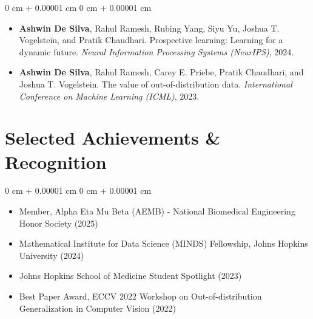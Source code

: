 \documentclass[10pt, letterpaper]{article}
\newenvironment{highlights}{
    \begin{itemize}[
        topsep=0.10 cm,
        parsep=0.10 cm,
        partopsep=0pt,
        itemsep=0pt,
        leftmargin=0 cm + 10pt
    ]
}{
    \end{itemize}
} %
\newenvironment{onecolentry}{
    \begin{adjustwidth}{
        0 cm + 0.00001 cm
    }{
        0 cm + 0.00001 cm
    }
}{
    \end{adjustwidth}
} %
\newenvironment{twocolentry}[2][]{
    \onecolentry
    \def\secondColumn{#2}
    \setcolumnwidth{\fill, 4.5 cm}
    \begin{paracol}{2}
}{
    \switchcolumn \raggedleft \secondColumn
    \end{paracol}
    \endonecolentry
} %
\begin{document}
        \begin{onecolentry}
            \begin{highlights}
                 \item \textbf{Ashwin De Silva}, Rahul Ramesh, Rubing Yang, Siyu Yu, Joshua T. Vogelstein, and Pratik Chaudhari. Prospective learning: Learning for a dynamic future. \textit{Neural Information Processing Systems (NeurIPS)}, 2024.
                 \item \textbf{Ashwin De Silva}, Rahul Ramesh, Carey E. Priebe, Pratik Chaudhari, and Joshua T. Vogelstein. The value of out-of-distribution data. \textit{International Conference on Machine Learning (ICML)}, 2023.
            \end{highlights}
        \end{onecolentry}


    \section{Selected Achievements \& Recognition}

    \begin{onecolentry}
        \begin{highlights}
            \item Member, Alpha Eta Mu Beta (AEMB) - National Biomedical Engineering Honor Society (2025)
            \item Mathematical Institute for Data Science (MINDS) Fellowship, Johns Hopkins University (2024)
            \item Johns Hopkins School of Medicine Student Spotlight (2023)
            \item Best Paper Award, ECCV 2022 Workshop on Out-of-distribution Generalization in Computer Vision (2022)
        \end{highlights}
    \end{onecolentry}
        

    



        
\end{document}
